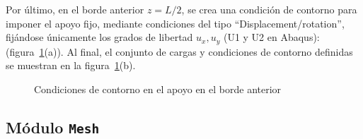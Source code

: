 \documentclass[spanish,a4paper,12pt]{article}
\begin{document}
Por último, en el borde anterior $z=L/2$, se crea una condición de contorno para imponer el apoyo fijo, mediante condiciones del tipo ``Displacement/rotation'', fijándose únicamente los grados de libertad $u_{x}, u_{y}$ (U1 y U2 en Abaqus):
(figura~\ref{fig:apoyo}(a)).
Al final, el conjunto de cargas y condiciones de contorno definidas se muestran en la figura~\ref{fig:apoyo}(b).
\begin{figure}[h!tp]
\centering
{}
\caption{Condiciones de contorno en el apoyo en el borde anterior}
\label{fig:apoyo}
\end{figure}
\clearpage

\subsection{Módulo \texttt{Mesh}}
\end{document}

